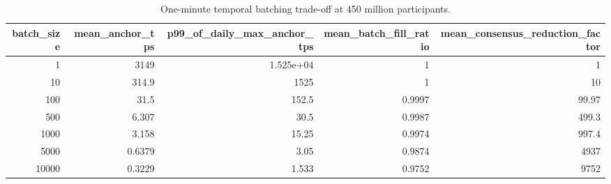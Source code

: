 \begin{table}[t]
\centering
\small
\caption{One-minute temporal batching trade-off at 450 million participants.}
\label{tab:batching}
\begin{tabular}{rrrrr}
\toprule
batch\_size & mean\_anchor\_tps & p99\_of\_daily\_max\_anchor\_tps & mean\_batch\_fill\_ratio & mean\_consensus\_reduction\_factor \\
\midrule
1 & 3149 & 1.525e+04 & 1 & 1 \\
10 & 314.9 & 1525 & 1 & 10 \\
100 & 31.5 & 152.5 & 0.9997 & 99.97 \\
500 & 6.307 & 30.5 & 0.9987 & 499.3 \\
1000 & 3.158 & 15.25 & 0.9974 & 997.4 \\
5000 & 0.6379 & 3.05 & 0.9874 & 4937 \\
10000 & 0.3229 & 1.533 & 0.9752 & 9752 \\
\bottomrule
\end{tabular}
\end{table}
